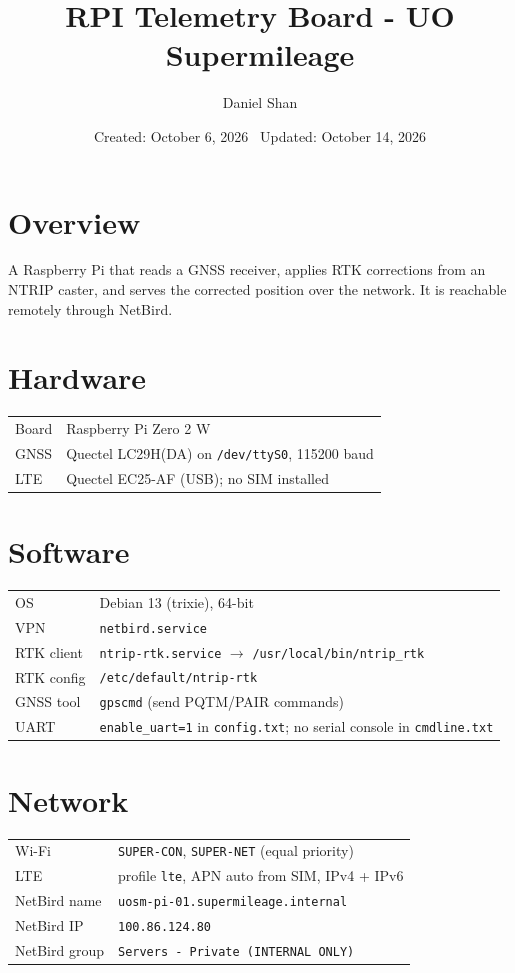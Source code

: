 \documentclass{article}
\title{RPI Telemetry Board - UO Supermileage}
\author{Daniel Shan}
\date{Created: October 6, 2026 \ Updated: October 14, 2026}
\begin{document}
\maketitle

\section{Overview}
A Raspberry Pi that reads a GNSS receiver, applies RTK corrections from an NTRIP caster,
and serves the corrected position over the network. It is reachable remotely through NetBird.

\section{Hardware}
\begin{tabular}{@{}ll@{}}
\toprule
Board & Raspberry Pi Zero 2 W \\
GNSS  & Quectel LC29H(DA) on \texttt{/dev/ttyS0}, 115200 baud \\
LTE   & Quectel EC25-AF (USB); no SIM installed \\
\bottomrule
\end{tabular}

\section{Software}
\begin{tabular}{@{}ll@{}}
\toprule
OS              & Debian 13 (trixie), 64-bit \\
VPN             & \texttt{netbird.service} \\
RTK client      & \texttt{ntrip-rtk.service} $\rightarrow$ \texttt{/usr/local/bin/ntrip\_rtk} \\
RTK config      & \texttt{/etc/default/ntrip-rtk} \\
GNSS tool       & \texttt{gpscmd} (send PQTM/PAIR commands) \\
UART            & \texttt{enable\_uart=1} in \texttt{config.txt}; no serial console in \texttt{cmdline.txt} \\
\bottomrule
\end{tabular}

\section{Network}
\begin{tabular}{@{}ll@{}}
\toprule
Wi-Fi           & \texttt{SUPER-CON}, \texttt{SUPER-NET} (equal priority) \\
LTE             & profile \texttt{lte}, APN auto from SIM, IPv4 + IPv6 \\
NetBird name    & \texttt{uosm-pi-01.supermileage.internal} \\
NetBird IP      & \texttt{100.86.124.80} \\
NetBird group   & \texttt{Servers - Private (INTERNAL ONLY)} \\
\bottomrule
\end{tabular}
\end{document}
